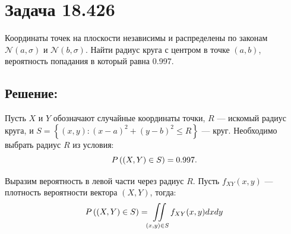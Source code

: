 \section*{Задача 18.426}

Координаты точек на плоскости независимы и распределены по законам $\mathcal{N} \left ( a, \sigma \right )$ и $\mathcal{N} \left ( b, \sigma \right )$. Найти радиус круга
с центром в точке $\left ( a, b \right )$, вероятность попадания в который равна 0.997.

\subsection*{Решение:}

Пусть $X$ и $Y$ обозначают случайные координаты точки, $R$ --- искомый радиус круга, и $S = \left \{ (x,y) : (x-a)^2 + (y-b)^2 \le R \right \}$ --- круг. Необходимо выбрать
радиус $R$ из условия:
\begin{equation}
    P \left ( \left ( X, Y \right ) \in S \right ) = 0.997.
\end{equation}

Выразим вероятность в левой части через радиус $R$. Пусть $f_{XY}(x,y)$ --- плотность вероятности вектора $\left ( X, Y \right )$, тогда:
\begin{equation}
    P \left ( \left ( X, Y \right ) \in S \right ) = \iint \limits_{(x,y) \in S} f_{XY}(x,y) dx dy
\end{equation}

